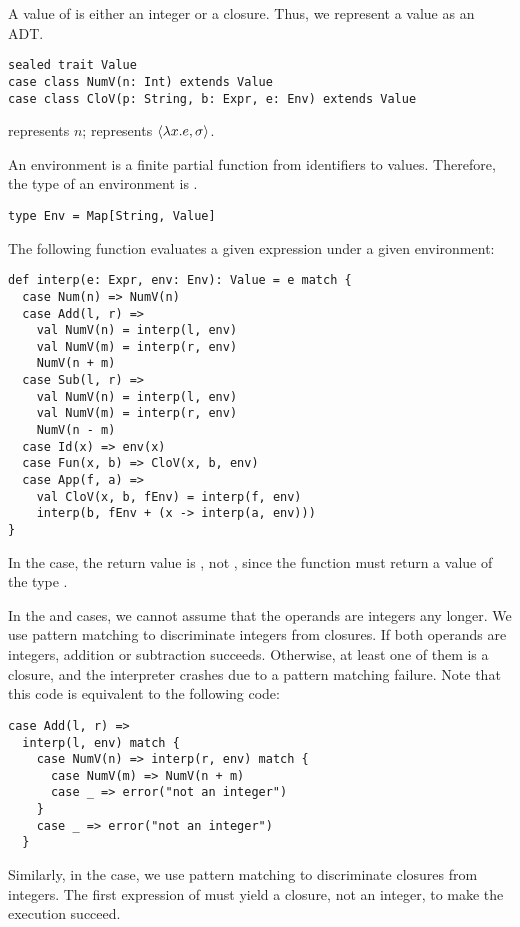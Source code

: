 A value of \Lang is either an integer or a closure. Thus, we represent a value
as an ADT.

\begin{verbatim}
sealed trait Value
case class NumV(n: Int) extends Value
case class CloV(p: String, b: Expr, e: Env) extends Value
\end{verbatim}

 represents $n$;  represents
$\langle\lambda x.e,\sigma\rangle$.

An environment is a finite partial function from identifiers to values.
Therefore, the type of an environment is .

\begin{verbatim}
type Env = Map[String, Value]
\end{verbatim}

The following function evaluates a given expression under a given environment:

\begin{verbatim}
def interp(e: Expr, env: Env): Value = e match {
  case Num(n) => NumV(n)
  case Add(l, r) =>
    val NumV(n) = interp(l, env)
    val NumV(m) = interp(r, env)
    NumV(n + m)
  case Sub(l, r) =>
    val NumV(n) = interp(l, env)
    val NumV(m) = interp(r, env)
    NumV(n - m)
  case Id(x) => env(x)
  case Fun(x, b) => CloV(x, b, env)
  case App(f, a) =>
    val CloV(x, b, fEnv) = interp(f, env)
    interp(b, fEnv + (x -> interp(a, env)))
}
\end{verbatim}

In the  case, the return value is , not ,
since the function must return a value of the type .

In the
 and  cases, we cannot assume that the operands are integers
any longer. We use pattern matching to discriminate integers from closures. If
both operands are integers, addition or subtraction succeeds. Otherwise, at
least one of them is a closure, and the interpreter crashes due to a pattern
matching failure. Note that this code is equivalent to the following code:

\begin{verbatim}
case Add(l, r) =>
  interp(l, env) match {
    case NumV(n) => interp(r, env) match {
      case NumV(m) => NumV(n + m)
      case _ => error("not an integer")
    }
    case _ => error("not an integer")
  }
\end{verbatim}

Similarly, in the  case, we use pattern matching to discriminate
closures from integers. The first expression of  must yield a closure,
not an integer, to make the execution succeed.


